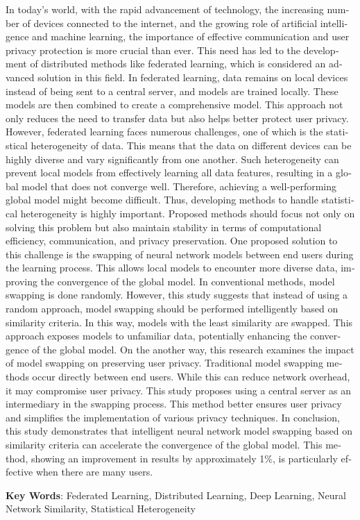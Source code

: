 \begin{latin}
\begin{small}
\baselineskip=0.6cm
In today's world, with the rapid advancement of technology, the increasing number of devices connected to the internet, and the growing role of artificial intelligence and machine learning, the importance of effective communication and user privacy protection is more crucial than ever. This need has led to the development of distributed methods like federated learning, which is considered an advanced solution in this field. In federated learning, data remains on local devices instead of being sent to a central server, and models are trained locally. These models are then combined to create a comprehensive model. This approach not only reduces the need to transfer data but also helps better protect user privacy.
However, federated learning faces numerous challenges, one of which is the statistical heterogeneity of data. This means that the data on different devices can be highly diverse and vary significantly from one another. Such heterogeneity can prevent local models from effectively learning all data features, resulting in a global model that does not converge well. Therefore, achieving a well-performing global model might become difficult. Thus, developing methods to handle statistical heterogeneity is highly important. Proposed methods should focus not only on solving this problem but also maintain stability in terms of computational efficiency, communication, and privacy preservation.
One proposed solution to this challenge is the swapping of neural network models between end users during the learning process. This allows local models to encounter more diverse data, improving the convergence of the global model. In conventional methods, model swapping is done randomly. However, this study suggests that instead of using a random approach, model swapping should be performed intelligently based on similarity criteria. In this way, models with the least similarity are swapped. This approach exposes models to unfamiliar data, potentially enhancing the convergence of the global model.
On the another way, this research examines the impact of model swapping on preserving user privacy. Traditional model swapping methods occur directly between end users. While this can reduce network overhead, it may compromise user privacy. This study proposes using a central server as an intermediary in the swapping process. This method better ensures user privacy and simplifies the implementation of various privacy techniques.
In conclusion, this study demonstrates that intelligent neural network model swapping based on similarity criteria can accelerate the convergence of the global model. This method, showing an improvement in results by approximately 1{\footnotesize \(\%\)}, is particularly effective when there are many users.



\end{small}

\vspace{0.5 cm}

\noindent \textbf{Key Words}: Federated Learning, Distributed Learning, Deep Learning, Neural Network Similarity, Statistical Heterogeneity

\end{latin}